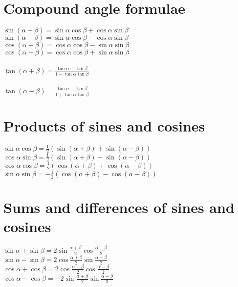 \documentclass[a4paper, 10pt]{scrartcl}
\begin{document}
\section*{Compound angle formulae}
$\sin{(\alpha + \beta)} = \sin{\alpha}\cos{\beta} + \cos{\alpha}\sin{\beta}$\\
$\sin{(\alpha - \beta)} = \sin{\alpha}\cos{\beta} - \cos{\alpha}\sin{\beta}$\\
$\cos{(\alpha + \beta)} = \cos{\alpha}\cos{\beta} - \sin{\alpha}\sin{\beta}$\\
$\cos{(\alpha - \beta)} = \cos{\alpha}\cos{\beta} + \sin{\alpha}\sin{\beta}$\\\\
$\tan{(\alpha + \beta)} = \frac{\tan{\alpha} + \tan{\beta}}{1 - \tan{\alpha}\tan{\beta}}$\\\\
$\tan{(\alpha - \beta)} = \frac{\tan{\alpha} - \tan{\beta}}{1 + \tan{\alpha}\tan{\beta}}$\\

\section*{Products of sines and cosines}
$\sin{\alpha}\cos{\beta} = \frac{1}{2}(\sin{(\alpha + \beta)} + \sin{(\alpha - \beta)})$\\
$\cos{\alpha}\sin{\beta} = \frac{1}{2}(\sin{(\alpha + \beta)} - \sin{(\alpha - \beta)})$\\
$\cos{\alpha}\cos{\beta} = \frac{1}{2}(\cos{(\alpha + \beta)} + \cos{(\alpha - \beta)})$\\
$\sin{\alpha}\sin{\beta} = -\frac{1}{2}(\cos{(\alpha + \beta)} - \cos{(\alpha - \beta)})$\\

\section*{Sums and differences of sines and cosines}
$\sin{\alpha} + \sin{\beta} = 2\sin{\frac{\alpha + \beta}{2}}\cos{\frac{\alpha - \beta}{2}}$\\
$\sin{\alpha} - \sin{\beta} = 2\cos{\frac{\alpha + \beta}{2}}\sin{\frac{\alpha - \beta}{2}}$\\
$\cos{\alpha} + \cos{\beta} = 2\cos{\frac{\alpha + \beta}{2}}\cos{\frac{\alpha - \beta}{2}}$\\
$\cos{\alpha} - \cos{\beta} = -2\sin{\frac{\alpha + \beta}{2}}\sin{\frac{\alpha - \beta}{2}}$\\
\end{document}
